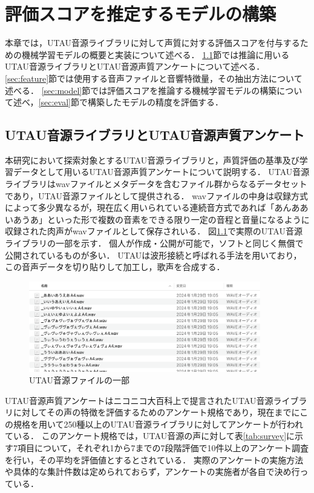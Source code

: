 \chapter{評価スコアを推定するモデルの構築}
\thispagestyle{myheadings}
\label{chap:model}

本章では，UTAU音源ライブラリに対して声質に対する評価スコアを付与するための機械学習モデルの概要と実装について述べる．
\ref{sec:utau}節では推論に用いるUTAU音源ライブラリとUTAU音源声質アンケートについて述べる．
\ref{sec:feature}節では使用する音声ファイルと音響特徴量，その抽出方法について述べる．
\ref{sec:model}節では評価スコアを推論する機械学習モデルの構築について述べ，\ref{sec:eval}節で構築したモデルの精度を評価する．

\section{UTAU音源ライブラリとUTAU音源声質アンケート}
\label{sec:utau}

本研究において探索対象とするUTAU音源ライブラリと，声質評価の基準及び学習データとして用いるUTAU音源声質アンケートについて説明する．
UTAU音源ライブラリはwavファイルとメタデータを含むファイル群からなるデータセットであり，UTAU音源ファイルとして提供される．
wavファイルの中身は収録方式によって多少異なるが，現在広く用いられている連続音方式であれば「あんああいあうあ」\cite{tatsu3shiki}といった形で複数の音素をできる限り一定の音程と音量になるように収録された肉声がwavファイルとして保存されいる．
図\ref{fig:utau_files}で実際のUTAU音源ライブラリの一部を示す．
個人が作成・公開が可能で，ソフトと同じく無償で公開されているものが多い．
UTAUは波形接続と呼ばれる手法を用いており，この音声データを切り貼りして加工し，歌声を合成する．

\begin{figure}[htb]
  \centering
  \includegraphics[width=0.9\textwidth]{fig/utau_files.png}
  \caption{UTAU音源ファイルの一部}
  \label{fig:utau_files}
\end{figure}

UTAU音源声質アンケートはニコニコ大百科上で提言されたUTAU音源ライブラリに対してその声の特徴を評価するためのアンケート規格であり\cite{utausurvey}，現在までにこの規格を用いて250種以上のUTAU音源ライブラリに対してアンケートが行われている．
このアンケート規格では，UTAU音源の声に対して表\ref{tab:survey}に示す7項目について，それぞれ1から7までの7段階評価で10件以上のアンケート調査を行い，その平均を評価値とするとされている．
実際のアンケートの実施方法や具体的な集計件数は定められておらず，アンケートの実施者が各自で決め行っている．

